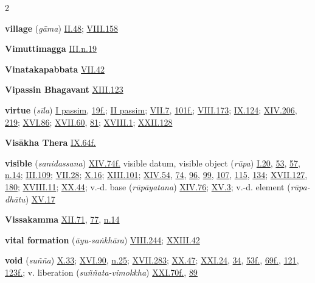 \begin{multicols}{2}
\begin{vismHanging}
\par\textbf{village} (\emph{gāma}) \hyperlink{II.48}{II.48}{}; \hyperlink{VIII.158}{VIII.158}{}
\par\textbf{Vimuttimagga} \hyperlink{III.n19}{III.n.19}{}
\par\textbf{Vinatakapabbata} \hyperlink{VII.42}{VII.42}{}
\par\textbf{Vipassin Bhagavant} \hyperlink{XIII.123}{XIII.123}{}
\par\textbf{virtue} (\emph{sīla}) \hyperlink{I}{I passim}{}, \hyperlink{I.19}{19f.}{}; \hyperlink{II}{II passim}{}; \hyperlink{VII.7}{VII.7}{}, \hyperlink{VII.101}{101f.}{}; \hyperlink{VIII.173}{VIII.173}{}; \hyperlink{IX.124}{IX.124}{}; \hyperlink{XIV.206}{XIV.206}{}, \hyperlink{XIV.219}{219}{}; \hyperlink{XVI.86}{XVI.86}{}; \hyperlink{XVII.60}{XVII.60}{}, \hyperlink{XVII.81}{81}{}; \hyperlink{XVIII.1}{XVIII.1}{}; \hyperlink{XXII.128}{XXII.128}{}
\par\textbf{Visākha Thera} \hyperlink{IX.64}{IX.64f.}{}
\par\textbf{visible} (\emph{sanidassana}) \hyperlink{XIV.74}{XIV.74f.}{} visible datum, visible object (\emph{rūpa}) \hyperlink{I.20}{I.20}{}, \hyperlink{I.53}{53}{}, \hyperlink{I.57}{57}{}, \hyperlink{I.n14}{n.14}{}; \hyperlink{III.109}{III.109}{}; \hyperlink{VII.28}{VII.28}{}; \hyperlink{X.16}{X.16}{}; \hyperlink{XIII.101}{XIII.101}{}; \hyperlink{XIV.54}{XIV.54}{}, \hyperlink{XIV.74}{74}{}, \hyperlink{XIV.96}{96}{}, \hyperlink{XIV.99}{99}{}, \hyperlink{XIV.107}{107}{}, \hyperlink{XIV.115}{115}{}, \hyperlink{XIV.134}{134}{}; \hyperlink{XVII.127}{XVII.127}{}, \hyperlink{XVII.180}{180}{}; \hyperlink{XVIII.11}{XVIII.11}{}; \hyperlink{XX.44}{XX.44}{}; v.-d. base (\emph{rūpāyatana}) \hyperlink{XIV.76}{XIV.76}{}; \hyperlink{XV.3}{XV.3}{}; v.-d. element (\emph{rūpa-dhātu}) \hyperlink{XV.17}{XV.17}{}
\par\textbf{Vissakamma} \hyperlink{XII.71}{XII.71}{}, \hyperlink{XII.77}{77}{}, \hyperlink{XII.n14}{n.14}{}
\par\textbf{vital formation} (\emph{āyu-saṅkhāra}) \hyperlink{VIII.244}{VIII.244}{}; \hyperlink{XXIII.42}{XXIII.42}{}
\par\textbf{void} (\emph{suñña}) \hyperlink{X.33}{X.33}{}; \hyperlink{XVI.90}{XVI.90}{}, \hyperlink{XVI.n25}{n.25}{}; \hyperlink{XVII.283}{XVII.283}{}; \hyperlink{XX.47}{XX.47}{}; \hyperlink{XXI.24}{XXI.24}{}, \hyperlink{XXI.34}{34}{}, \hyperlink{XXI.53}{53f.}{}, \hyperlink{XXI.69}{69f.}{}, \hyperlink{XXI.121}{121}{}, \hyperlink{XXI.123}{123f.}{}; v. liberation (\emph{suññata-vimokkha}) \hyperlink{XXI.70}{XXI.70f.}{}, \hyperlink{XXI.89}{89}{}

\end{vismHanging}
\end{multicols}
